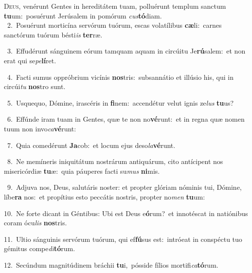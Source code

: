 \lettrine{\initial\textcolor{\initialcolor}{D}}{eus,} venérunt Gentes in hereditátem tuam, polluérunt templum sanctum \textbf{tu}\-um:~\star posuérunt Jerúsalem in pomórum \textit{cus}\-\textbf{tó}diam.\\
{\numbfont\textcolor{\numbcolor}{~2.}}~Posuérunt morticína servórum tuórum, escas volatílibus \textbf{cæ}\-li:~\star carnes sanctórum tuórum bésti\textit{is} \textbf{ter}\-ræ.\par
{\numbfont\textcolor{\numbcolor}{~3.}}~Effudérunt sánguinem eórum tamquam aquam in circúitu Je\-\textbf{rú}\-salem:~\star et non erat qui se\-\textit{pe}\-\textbf{lí}ret.\par
{\numbfont\textcolor{\numbcolor}{~4.}}~Facti sumus oppróbrium vicínis \textbf{nos}\-tris:~\star subsannátio et illúsio his, qui in circúi\textit{tu} \textbf{nos}\-tro sunt.\par
{\numbfont\textcolor{\numbcolor}{~5.}}~Usquequo, Dómine, irascéris in \textbf{fi}\-nem:~\star accendétur velut ignis ze\textit{lus} \textbf{tu}\-us?\par
{\numbfont\textcolor{\numbcolor}{~6.}}~Effúnde iram tuam in Gentes, quæ te non no\-\textbf{vé}\-runt:~\star et in regna quæ nomen tuum non invo\-\textit{ca}\-\textbf{vé}runt:\par
{\numbfont\textcolor{\numbcolor}{~7.}}~Quia comedérunt \textbf{Ja}\-cob:~\star et locum ejus deso\-\textit{la}\-\textbf{vé}runt.\par
{\numbfont\textcolor{\numbcolor}{~8.}}~Ne memíneris iniquitátum nostrárum antiquárum, cito antícipent nos misericórdiæ \textbf{tu}\-æ:~\star quia páuperes facti su\textit{mus} \textbf{ni}\-mis.\par
{\numbfont\textcolor{\numbcolor}{~9.}}~Adjuva nos, Deus, salutáris noster: et propter glóriam nóminis tui, Dómine, líbe\textbf{ra} nos:~\star et propítius esto peccátis nostris, propter no\textit{men} \textbf{tu}\-um:\par
{\numbfont\textcolor{\numbcolor}{10.}}~Ne forte dicant in Géntibus: Ubi est Deus e\-\textbf{ó}\-rum?~\star et innotéscat in natiónibus coram ócu\textit{lis} \textbf{nos}\-tris.\par
{\numbfont\textcolor{\numbcolor}{11.}}~Ultio sánguinis servórum tuórum, qui ef\-\textbf{fú}\-sus est:~\star intróeat in conspéctu tuo gémitus compe\-\textit{di}\-\textbf{tó}rum.\par
{\numbfont\textcolor{\numbcolor}{12.}}~Secúndum magnitúdinem bráchii \textbf{tu}\-i,~\star pósside fílios mortifi\-\textit{ca}\-\textbf{tó}rum.\par
